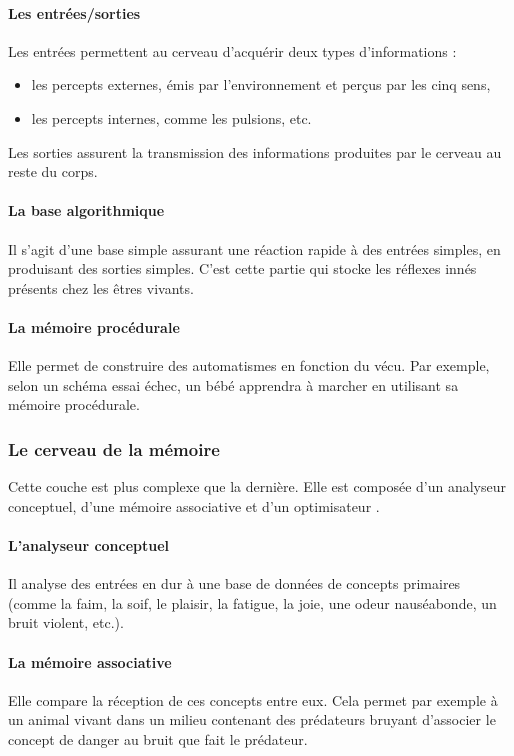 \paragraph{Les entrées/sorties}
Les entrées permettent au cerveau d'acquérir deux types d'informations :
\begin{itemize}
\item les percepts externes, émis par l'environnement et perçus par les cinq sens,
\item les percepts internes, comme les pulsions, etc. 
\end{itemize}

Les sorties assurent la transmission des informations produites par le cerveau au reste du corps.

\paragraph{La base algorithmique} Il s'agit d'une base simple assurant une réaction rapide à des entrées simples, en produisant des sorties simples. C'est cette partie qui stocke les réflexes innés présents chez les êtres vivants. 

\paragraph{La mémoire procédurale} Elle permet de construire des automatismes en fonction du vécu. Par exemple, selon un schéma essai échec, un bébé apprendra à marcher en utilisant sa mémoire procédurale.

\subsubsection{Le cerveau de la mémoire} Cette couche est plus
complexe que la dernière. Elle est composée d'un analyseur conceptuel, d'une mémoire
associative et d'un optimisateur
.
\paragraph {L'analyseur conceptuel} Il analyse des entrées en dur à une base de
données de concepts primaires (comme la faim, la soif, le plaisir, la fatigue, la joie, une odeur
nauséabonde, un bruit violent, etc.).
\paragraph {La mémoire associative} Elle compare la réception de ces concepts
entre eux. Cela permet par exemple à un animal vivant dans un milieu contenant des prédateurs
bruyant d’associer le concept de danger au bruit que fait le prédateur.
